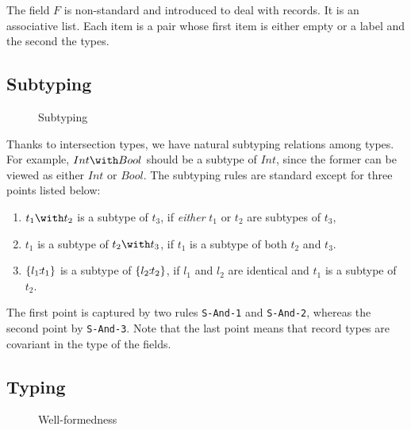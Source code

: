 The field $ F $ is non-standard and introduced to deal with records. It is an
associative list. Each item is a pair whose first item is either empty or a
label and the second the types.




\subsection{Subtyping}

\begin{figure*}

\caption{Subtyping}
\end{figure*}

Thanks to intersection types, we have natural subtyping relations among types.
For example, $ Int \with Bool $ should be a subtype of $ Int $, since the former
can be viewed as either $ Int $ or $ Bool $. The subtyping rules are standard
except for three points listed below:
\begin{enumerate}
\item $ t_1 \with t_2 $ is a subtype of $ t_3 $, if \emph{either} $ t_1 $ or
  $ t_2 $ are subtypes of $ t_3 $,

\item $ t_1 $ is a subtype of $ t_2 \with t_3 $, if $ t_1 $ is a subtype of
  both $ t_2 $ and $ t_3 $.

\item $ \{ l_1 \!\!:\!\! t_1 \} $ is a subtype of $ \{ l_2 \!\!:\!\! t_2 \} $, if
  $ l_1 $ and $ l_2 $ are identical and $ t_1 $ is a subtype of $ t_2 $.
\end{enumerate}
The first point is captured by two rules \texttt{S-And-1} and \texttt{S-And-2},
whereas the second point by \texttt{S-And-3}. Note that the last point means
that record types are covariant in the type of the fields.

\subsection{Typing}

\begin{figure*}

\caption{Well-formedness}
\end{figure*}


